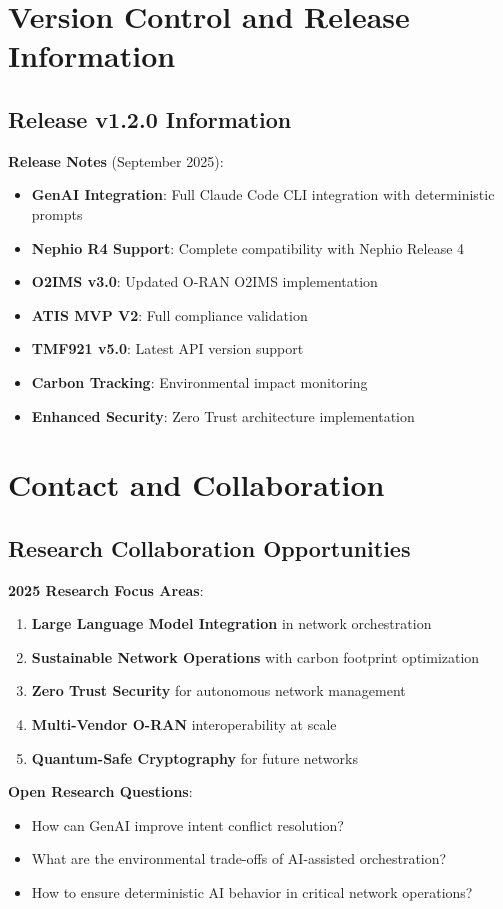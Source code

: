 \documentclass[conference]{IEEEtran}
\begin{document}
\section{Version Control and Release Information}

\subsection{Release v1.2.0 Information}

\textbf{Release Notes} (September 2025):
\begin{itemize}
\item \textbf{GenAI Integration}: Full Claude Code CLI integration with deterministic prompts
\item \textbf{Nephio R4 Support}: Complete compatibility with Nephio Release 4
\item \textbf{O2IMS v3.0}: Updated O-RAN O2IMS implementation
\item \textbf{ATIS MVP V2}: Full compliance validation
\item \textbf{TMF921 v5.0}: Latest API version support
\item \textbf{Carbon Tracking}: Environmental impact monitoring
\item \textbf{Enhanced Security}: Zero Trust architecture implementation
\end{itemize}

\section{Contact and Collaboration}

\subsection{Research Collaboration Opportunities}

\textbf{2025 Research Focus Areas}:
\begin{enumerate}
\item \textbf{Large Language Model Integration} in network orchestration
\item \textbf{Sustainable Network Operations} with carbon footprint optimization
\item \textbf{Zero Trust Security} for autonomous network management
\item \textbf{Multi-Vendor O-RAN} interoperability at scale
\item \textbf{Quantum-Safe Cryptography} for future networks
\end{enumerate}

\textbf{Open Research Questions}:
\begin{itemize}
\item How can GenAI improve intent conflict resolution?
\item What are the environmental trade-offs of AI-assisted orchestration?
\item How to ensure deterministic AI behavior in critical network operations?
\end{itemize}



\end{document}
